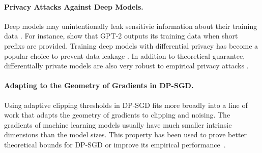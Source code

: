 \paragraph{Privacy Attacks Against Deep Models.} Deep models may unintentionally leak sensitivie information about their training data \citep{shokri2017membership,hitaj2017deep,zhu2019deep,song2019privacy,carlini2020extracting,choquette2021label,carlini2022membership,balle2022reconstructing}. For instance, \cite{carlini2020extracting} show that GPT-2 outputs its training data when short prefixs are provided. Training deep models with differential privacy has become a popular choice  to prevent data leakage \citep{abadi2016deep,papernot2016semi,mcmahan2018learning,zhu2020private}. In addition to theoretical guarantee, differentially private models are also very robust to empirical privacy attacks \citep{bernau2019assessing,carlini2019secret,yu2021large}. 


\paragraph{Adapting to the Geometry of Gradients in DP-SGD.} Using adaptive clipping thresholds in DP-SGD fits more broadly into a line of work that adapts the geometry of gradients to clipping and noising. The gradients of machine learning models usually have much smaller intrinsic dimensions than the model sizes. This property has been used to prove better theoretical bounds for DP-SGD or improve its empirical performance~\citep{kairouz2020fast,song2020characterizing,zhou2021bypassing,yu2021do,li2022does,ma2022dimension}.
